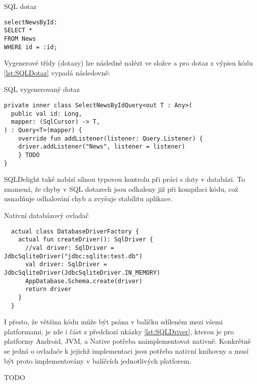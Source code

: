 \begin{listing}[H]
\caption{SQL dotaz}\label{lst:SQLDotaz}
\begin{verbatim}
selectNewsById:
SELECT *
FROM News
WHERE id = :id;
\end{verbatim}
\end{listing}


Vygenerové třídy (dotazy) lze následně nalézt ve složce  a pro dotaz z výpisu kódu \ref{lst:SQLDotaz}
vypadá následovně:

\begin{listing}[H]
\caption{SQL vygenerovaný dotaz}\label{lst:SQLGeneratedDotaz}
\begin{verbatim}
private inner class SelectNewsByIdQuery<out T : Any>(
  public val id: Long,
  mapper: (SqlCursor) -> T,
) : Query<T>(mapper) {
    override fun addListener(listener: Query.Listener) {
    driver.addListener("News", listener = listener)
    } TODO
}
\end{verbatim}
\end{listing}

SQLDelight také nabízí silnou typovou kontrolu při práci s daty v databázi. To znamená, že chyby v SQL dotazech jsou odhaleny již při
 kompilaci kódu, což usnadňuje odhalování chyb a zvyšuje stabilitu aplikace.

\begin{listing}[H]
\caption{Nativní databázový ovladač}\label{lst:DatabaseDriverFactory}
\begin{verbatim}
  actual class DatabaseDriverFactory {
    actual fun createDriver(): SqlDriver {
      //val driver: SqlDriver = JdbcSqliteDriver("jdbc:sqlite:test.db")
      val driver: SqlDriver = JdbcSqliteDriver(JdbcSqliteDriver.IN_MEMORY)
      AppDatabase.Schema.create(driver)
      return driver
    }
  }
\end{verbatim}
\end{listing}

I přesto, že většina kódu může být psána v balíčku sdíleném mezi všemi platformami, je zde i část z předchozí ukázky \ref{lst:SQLDriver},
kterou je pro platformy Android, JVM, a Native potřeba naimplementovat nativně. Konkrétně se jedná o ovladače k jejichž implementaci jsou 
potřeba nativní knihovny a musí být proto implementovány v balíčcích jednotlivých platforem.

TODO




